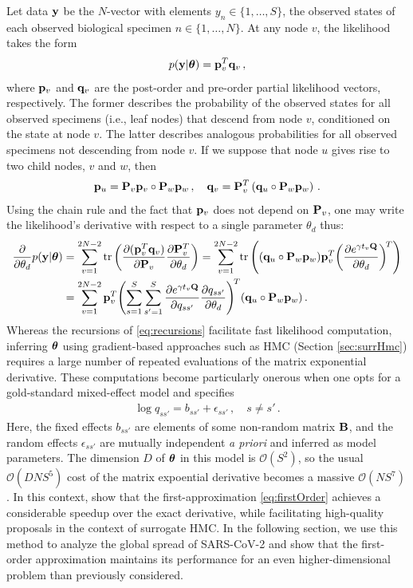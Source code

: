\documentclass[12pt]{article} %
\begin{document}
 Let data $\y$ be the $N$-vector with elements $y_n\in \{1,\dots,S\}$, the observed states of each observed biological specimen $n \in \{1,\dots,N\}$.  At any node $v$, the likelihood takes the form \citep{ji2020gradients}
 \begin{align}
p(\y|\ttheta) = \p_v^T \q_v \, ,
 \end{align}
where $\p_v$ and $\q_v$ are the post-order and pre-order partial likelihood vectors, respectively.  The former describes the probability of the observed states for all observed specimens (i.e., leaf nodes) that descend from node $v$, conditioned on the state at node $v$. The latter describes analogous probabilities for all observed specimens not descending from node $v$.  If we suppose that node $u$ gives rise to two child nodes, $v$ and $w$, then 
\begin{align}\label{eq:recursions}
	\p_u = \P_v \p_v \circ \P_w \p_w\, ,  \quad \q_v= \P_v^T \left( \q_u \circ  \P_w \p_w\right) \, .
\end{align}
Using the chain rule and the fact that $\p_v$ does not depend on $\P_v$, one may write the likelihood's derivative with respect to a single parameter $\theta_d$ thus:
\begin{align}\label{eq:phyloGrad}
	\frac{\partial}{\partial \theta_d}  p(\y|\ttheta) 
	&=   \sum_{v=1}^{2N-2} \mbox{tr} \left( \frac{\partial (\p_v^T\q_v)}{\partial \P_v} \frac{\partial \P^T_v}{\partial \theta_d} \right)
	= \sum_{v=1}^{2N-2} \mbox{tr} \left(  (\q_u\circ \P_w\p_w) \p_v^T\bigg( \frac{\partial e^{\gamma t_v \QQ}}{\partial \theta_d}\bigg)^{\!T}\right)  \\ \nonumber
	&=\sum_{v=1}^{2N-2} \p_v^T \Biggl(\sum_{s=1}^S \sum_{s'=1}^S \frac{\partial e^{\gamma t_v \QQ}}{\partial q_{ss'}} \frac{\partial q_{ss'}}{\partial \theta_d} \Biggr)^{\!T} (\q_u\circ \P_w\p_w)  \, .
\end{align}
Whereas the recursions of \eqref{eq:recursions} facilitate fast likelihood computation, inferring $\ttheta$ using gradient-based approaches such as HMC (Section \ref{sec:surrHmc}) requires a large number of repeated evaluations of the matrix exponential derivative.  These computations become particularly onerous when one opts for a gold-standard mixed-effect model \citep{magee2023random} and specifies
\begin{align}\label{eq:mixed}
\log q_{ss'} = b_{ss'} + \epsilon_{ss'} \,, \quad s\neq s'\, .
\end{align} 
Here, the fixed effects $b_{ss'}$ are elements of some non-random matrix $\B$, and the random effects $\epsilon_{ss'}$ are mutually independent \emph{a priori} and inferred as model parameters.  The dimension $D$ of $\ttheta$ in this model is $\mathcal{O}(S^2)$, so the usual $\mathcal{O}(DNS^5)$ cost of the matrix expoential derivative becomes a massive $\mathcal{O}(NS^7)$.  In this context, \citet{magee2023random} show that the first-approximation \eqref{eq:firstOrder} achieves a considerable speedup over the exact derivative, while facilitating high-quality proposals in the context of surrogate HMC.  In the following section, we use this method to analyze the global spread of SARS-CoV-2 and show that the first-order approximation maintains its performance for an even higher-dimensional problem than previously considered.
\end{document}
